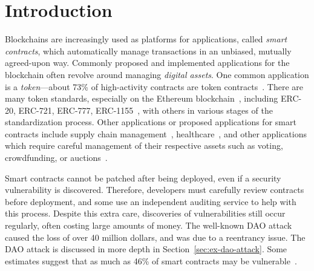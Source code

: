 \documentclass[dvipsnames, usenames, sigconf]{acmart}
\begin{document}

\maketitle


\section{Introduction}

Blockchains are increasingly used as platforms for applications, called \emph{smart contracts}, which automatically manage transactions in an unbiased, mutually agreed-upon way.
Commonly proposed and implemented applications for the blockchain often revolve around managing \emph{digital assets}.
One common application is a \emph{token}---about 73\% of high-activity contracts
are token contracts~\cite{OlivaEtAl2019}. %
There are many token standards, especially on the Ethereum blockchain~\cite{wood2014ethereum}, including ERC-20, ERC-721, ERC-777, ERC-1155~\cite{erc20,erc721,erc777,erc1155}, with others in various stages of the standardization process.
Other applications or proposed applications for smart contracts include supply chain management~\cite{SupplyChainUse}, healthcare~\cite{HealthcareUse}, and other applications which require careful management of their respective assets such as voting, crowdfunding, or auctions~\cite{Elsden18:Making}.

Smart contracts cannot be patched after being deployed, even if a security vulnerability is discovered.
Therefore, developers must carefully review contracts before deployment, and some use an independent auditing service to help with this process.
Despite this extra care, discoveries of vulnerabilities still occur regularly, often costing large amounts of money.
The well-known DAO attack~\cite{DAO} caused the loss of over 40 million dollars, and was due to a reentrancy issue.
The DAO attack is discussed in more depth in Section~\ref{sec:ex-dao-attack}.
Some estimates suggest that as much as 46\% of smart contracts may be vulnerable~\cite{luuOyente}.
\end{document}
